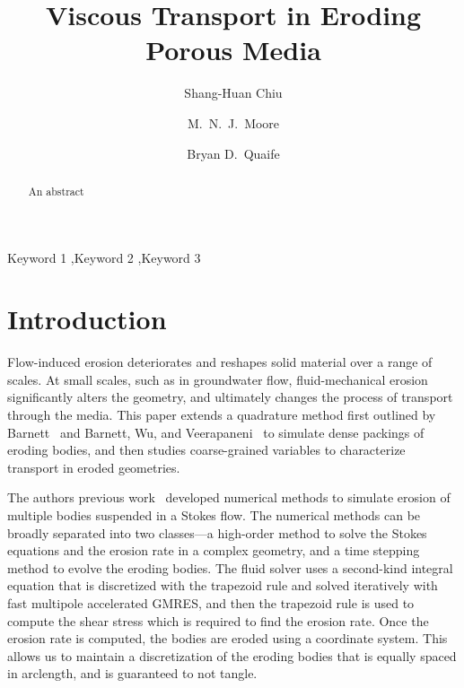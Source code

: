 \documentclass[preprint, 10pt]{elsarticle}
\begin{document}
\title{Viscous Transport in Eroding Porous Media}



\author[SH]{Shang-Huan Chiu}
\author[Nick]{M.~N.~J.~Moore}
\author[Bryan]{Bryan D.~Quaife}

\address[SH]{Department of Scientific Computing, Florida State
University, Tallahassee, FL, 32306.}
\address[Nick]{Department of Mathematics and Geophysical Fluid Dynamics Institute, Florida State University, Tallahassee, FL, 32306.}
\address[Bryan]{Department of Scientific Computing and Geophysical Fluid Dynamics Institute, Florida State University, Tallahassee, FL, 32306.}

\begin{abstract} 
  An abstract
\end{abstract}

\begin{keyword}
  Keyword 1 \sep Keyword 2 \sep Keyword 3 
\end{keyword}

\maketitle

\section{Introduction}
\label{s:intro}
Flow-induced erosion deteriorates and reshapes solid material over a
range of scales.  At small scales, such as in groundwater flow,
fluid-mechanical erosion significantly alters the geometry, and
ultimately changes the process of transport through the media.  This
paper extends a quadrature method first outlined by
Barnett~\cite{bar2014} and Barnett, Wu, and
Veerapaneni~\cite{bar-wu-vee2015} to simulate dense packings of eroding
bodies, and then studies coarse-grained variables to characterize
transport in eroded geometries.

The authors previous work~\cite{qua-moo2018} developed numerical methods
to simulate erosion of multiple bodies suspended in a Stokes flow.  The
numerical methods can be broadly separated into two classes---a
high-order method to solve the Stokes equations and the erosion rate in
a complex geometry, and a time stepping method to evolve the eroding
bodies.  The fluid solver uses a second-kind integral equation that is
discretized with the trapezoid rule and solved iteratively with fast
multipole accelerated GMRES, and then the trapezoid rule is used to
compute the shear stress which is required to find the erosion rate.
Once the erosion rate is computed, the bodies are eroded using a {\thL}
coordinate system.  This allows us to maintain a discretization of the
eroding bodies that is equally spaced in arclength, and is guaranteed to
not tangle.
\end{document}
